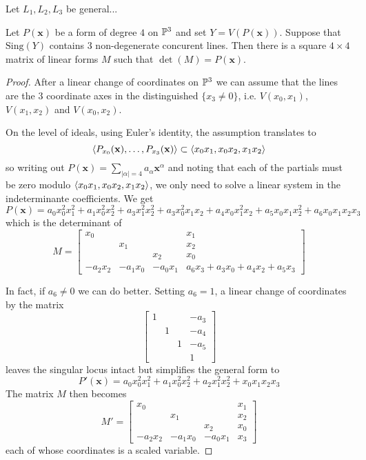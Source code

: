 \documentclass[fleqn,reqno]{amsart}
\numberwithin{first}{chapter}
\begin{document}
\begin{lemma}
Let $L_1,L_2,L_3$ be general...
\end{lemma}

\begin{lemma}[$\mt{ex10}$]
\label{lucky-comp}
Let $P(\mathbf x)$ be a form of degree $4$ on $\mathbb{P}^3$ and set $Y=V(P(\mathbf x))$.
Suppose that $\mathrm{Sing}(Y)$ contains 3 non-degenerate concurent lines.
Then there is a square $4\times4$ matrix of linear forms $M$ such that $\det(M)=P(\mathbf x)$.
\end{lemma}

\begin{proof}
After a linear change of coordinates on $\mathbb{P}^3$ we can assume that the lines are the
3 coordinate axes in the distinguished $\{x_3\neq0\}$, i.e. $V(x_0,x_1)$, $V(x_1,x_2)$ and $V(x_0,x_2)$.

On the level of ideals, using Euler's identity, the assumption translates to
\[
\langle P_{x_0}(\mathbf x),\ldots, P_{x_3}(\mathbf x) \rangle\subset\langle x_0x_1,x_0x_2,x_1x_2\rangle
\]
so writing out $P(\mathbf x)=\sum_{|\alpha|=4} a_\alpha {\mathbf x}^\alpha$
and noting that each of the partials must be zero modulo $\langle x_0x_1,x_0x_2,x_1x_2\rangle$,
we only need to solve a linear system in the indeterminante coefficients.
We get
\[
P(\mathbf x)=
a_0x_0^2x_1^2+a_1x_0^2x_2^2+a_3x_1^2x_2^2+a_3x_0^2x_1x_2+a_4x_0x_1^2x_2+a_5x_0x_1x_2^2+a_6x_0x_1x_2x_3
\]
which is the determinant of
\[
M=\begin{bmatrix}
x_0&&&x_1\\
&x_1&&x_2\\
&&x_2&x_0\\
-a_2x_2&-a_1x_0&-a_0x_1&a_6x_3+a_3x_0+a_4x_2+a_5x_3
\end{bmatrix}
\]

In fact, if $a_6\neq0$ we can do better.
Setting $a_6=1$, a linear change of coordinates by the matrix
\[
\begin{bmatrix}
1&&&-a_3\\
&1&&-a_4\\
&&1&-a_5\\
&&&1
\end{bmatrix}
\]
leaves the singular locus intact but simplifies the general form to
\[
P'(\mathbf x)=a_0x_0^2x_1^2+a_1x_0^2x_2^2+a_2x_1^2x_2^2+x_0x_1x_2x_3
\]
The matrix $M$ then becomes
\[
M'=\begin{bmatrix}
x_0&&&x_1\\
&x_1&&x_2\\
&&x_2&x_0\\
-a_2x_2&-a_1x_0&-a_0x_1&x_3
\end{bmatrix}
\]
each of whose coordinates is a scaled variable.
\end{proof}
\end{document}
